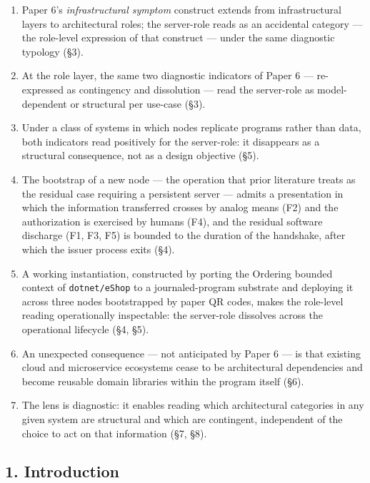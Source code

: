 \documentclass[
]{article}
\providecommand{\tightlist}{%
  \setlength{\itemsep}{0pt}\setlength{\parskip}{0pt}}
\begin{document}
\begin{enumerate}
\def\labelenumi{\arabic{enumi}.}
\tightlist
\item
  Paper 6's \emph{infrastructural symptom} construct extends from
  infrastructural layers to architectural roles; the server-role reads
  as an accidental category --- the role-level expression of that
  construct --- under the same diagnostic typology (§3).
\item
  At the role layer, the same two diagnostic indicators of Paper 6 ---
  re-expressed as contingency and dissolution --- read the server-role
  as model-dependent or structural per use-case (§3).
\item
  Under a class of systems in which nodes replicate programs rather than
  data, both indicators read positively for the server-role: it
  disappears as a structural consequence, not as a design objective
  (§5).
\item
  The bootstrap of a new node --- the operation that prior literature
  treats as the residual case requiring a persistent server --- admits a
  presentation in which the information transferred crosses by analog
  means (F2) and the authorization is exercised by humans (F4), and the
  residual software discharge (F1, F3, F5) is bounded to the duration of
  the handshake, after which the issuer process exits (§4).
\item
  A working instantiation, constructed by porting the Ordering bounded
  context of \texttt{dotnet/eShop} to a journaled-program substrate and
  deploying it across three nodes bootstrapped by paper QR codes, makes
  the role-level reading operationally inspectable: the server-role
  dissolves across the operational lifecycle (§4, §5).
\item
  An unexpected consequence --- not anticipated by Paper 6 --- is that
  existing cloud and microservice ecosystems cease to be architectural
  dependencies and become reusable domain libraries within the program
  itself (§6).
\item
  The lens is diagnostic: it enables reading which architectural
  categories in any given system are structural and which are
  contingent, independent of the choice to act on that information (§7,
  §8).
\end{enumerate}

\subsection{1. Introduction}\label{introduction}
\end{document}
